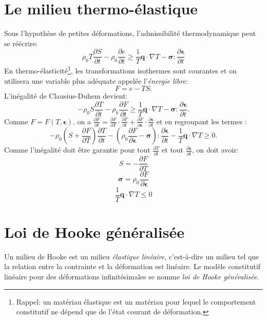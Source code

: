 \section{Le milieu thermo-élastique}
Sous l'hypothèse de petites déformations, l'admissibilité thermodynamique peut se réécrire:
$$\rho_0T\frac{\partial S}{\partial t}-\rho_0\frac{\partial e}{\partial t}\geq\frac{1}{T}\textbf{q}\cdot\nabla T-\boldsymbol{\sigma}:\frac{\partial \boldsymbol{\epsilon}}{\partial t}$$
En thermo-élasticité\footnote{Rappel: un matériau élastique est un matériau pour lequel le comportement constitutif ne dépend que de l'état courant de déformation.}, les transformations isothermes sont courantes et on utilisera une variable plus adéquate appelée l'\emph{énergie libre}:
$$F=e-TS.$$
L'inégalité de Clausius-Duhem devient: $$-\rho_0S\frac{\partial T}{\partial t}-\rho_0\frac{\partial F}{\partial t}\geq\frac{1}{T}\textbf{q}\cdot\nabla T-\boldsymbol{\sigma}:\frac{\partial \boldsymbol{\epsilon}}{\partial t}.$$
Comme $F=F(T,\boldsymbol{\epsilon})$, on a $\frac{\partial F}{\partial t} =\frac{\partial F}{\partial T}\cdot\frac{\partial T}{\partial t}+\frac{\partial F}{\partial\boldsymbol{\epsilon}}\cdot\frac{\partial\boldsymbol{\epsilon}}{\partial t}$ et en regroupant les termes :
$$-\rho_0\left(S+\frac{\partial F}{\partial T}\right)\frac{\partial T}{\partial t}-\left(\rho_0\frac{\partial F}{\partial\boldsymbol{\epsilon}}-\boldsymbol{\sigma}\right):\frac{\partial \boldsymbol{\epsilon}}{\partial t}-\frac{1}{T}\textbf{q}\cdot\nabla T\geq 0.$$
Comme l'inégalité doit être garantie pour tout $\frac{\partial T}{\partial t}$ et tout $\frac{\partial\boldsymbol{\epsilon}}{\partial t}$, on doit avoir:
$$\boxed{S=-\frac{\partial F}{\partial T}}$$
$$\boxed{\boldsymbol{\sigma}=\rho_0\frac{\partial F}{\partial \boldsymbol{\epsilon}}}$$
$$\frac{1}{T}\textbf{q}\cdot\nabla T\leq 0$$

\section{Loi de Hooke généralisée}
Un milieu de Hooke est un milieu \emph{élastique linéaire}, c'est-à-dire un milieu tel que la relation entre la contrainte et la déformation est linéaire. Le modèle constitutif linéaire pour des déformations infinitésimales se nomme \emph{loi de Hooke généralisée}.
